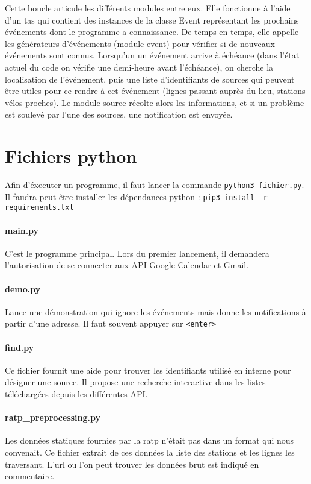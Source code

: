 \documentclass[a4paper, 8pt]{article}
\begin{document}
Cette boucle articule les différents modules entre eux.
Elle fonctionne à l'aide d'un tas qui contient des instances de la classe Event
représentant les prochains événements dont le programme a connaissance.
De temps en temps, elle appelle les générateurs d'événements (module event) pour
vérifier si de nouveaux événements sont connus.
Lorsqu'un un événement arrive à échéance (dans l'état actuel du code on vérifie une
demi-heure avant l'échéance), on cherche la localisation de l'événement, puis
une liste d'identifiants de sources qui peuvent être utiles pour ce rendre à cet
événement (lignes passant auprès du lieu, stations vélos proches).
Le module source récolte alors les informations, et si un problème est soulevé
par l'une des sources, une notification est envoyée.


\section{Fichiers python}

Afin d'éxecuter un programme, il faut lancer la commande
\texttt{python3 fichier.py}.
Il faudra peut-être installer les dépendances python :
\texttt{pip3 install -r requirements.txt}

\paragraph{main.py} C'est le programme principal. Lors du premier lancement,
il demandera l'autorisation de se connecter aux API Google Calendar et Gmail.

\paragraph{demo.py} Lance une démonstration qui ignore les événements mais donne les
notifications à partir d'une adresse. Il faut souvent appuyer sur
\texttt{<enter>}

\paragraph{find.py} Ce fichier fournit une aide
pour trouver les identifiants utilisé en interne pour désigner une source.
Il propose une recherche interactive dans les listes téléchargées depuis les
différentes API.

\paragraph{ratp\_preprocessing.py} Les données statiques fournies par la ratp
n'était pas dans un format qui nous convenait.
Ce fichier extrait de ces données la liste des stations et les lignes les
traversant. L'url ou l'on peut trouver les données brut est indiqué en
commentaire.
\end{document}
